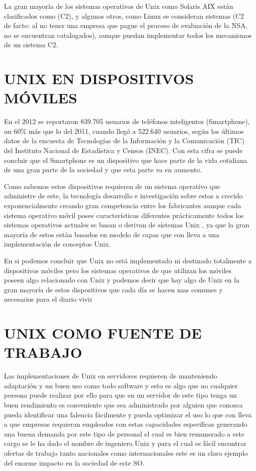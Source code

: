 La gran mayoría de los sistemas operativos de  Unix  como Solaris AIX están clasificados  como (C2), y algunos otros, como  Linux  se consideran sistemas  (C2 de facto: al  no 
tener  una empresa que pague el proceso de evaluación de la NSA, no se encuentran catalogados), aunque  puedan implementar todos  los mecanismos  de un sistema C2.


\section*{UNIX EN DISPOSITIVOS MÓVILES}
En el 2012 se reportaron 839.705 usuarios de teléfonos inteligentes (Smartphone), un 60\% más que lo del 2011, cuando llegó a 522.640 usuarios, según los últimos datos de la 
encuesta de Tecnologías de la Información y la Comunicación (TIC) del Instituto Nacional de Estadística y Censos (INEC).  Con esta cifra se puede concluir que el Smartphone es un 
dispositivo que hace parte de la vida cotidiana de una gran parte de la sociedad y que esta parte va en aumento.

Como sabemos estos dispositivos requieren de un sistema operativo que  administre de este, la tecnología desarrollo e investigación sobre estos a crecido exponencialmente creando 
gran competencia entre los fabricantes aunque cada sistema operativo móvil posee características diferentes prácticamente todos los sistemas operativos actuales se basan o 
derivan de sistemas Unix , ya que la gran mayoría de estos están basados en  modelo de capas que con lleva a una implementación de conceptos Unix.

En si podemos concluir que Unix no está implementado ni destinado totalmente a dispositivos móviles pero los sistemas operativos de que utilizan los móviles poseen algo 
relacionado con Unix y podemos decir que hay algo de Unix en la gran mayoría de estos dispositivos que cada día se hacen mas comunes y necesarios para el diario vivir


\section*{UNIX COMO FUENTE DE TRABAJO}
Las implementaciones de Unix en servidores requieren de manteniendo adaptación y un buen uso como todo software y esto es algo que no cualquier persona puede realizar por ello 
para que en un servidor de este tipo tenga un buen rendimiento es conveniente que sea administrado por alguien que conozca pueda identificar una falencia fácilmente y pueda 
optimizar el uso lo que con lleva a que empresas requieran  empleados con estas capacidades especificas generando una buena demanda por este tipo de personal el cual es bien 
remunerado a este cargo se le ha dado el nombre de ingeniero Unix y para el cual es fácil encontrar ofertas de trabajo tanto nacionales como internacionales este es un claro 
ejemplo del enorme impacto en la sociedad de este SO.


